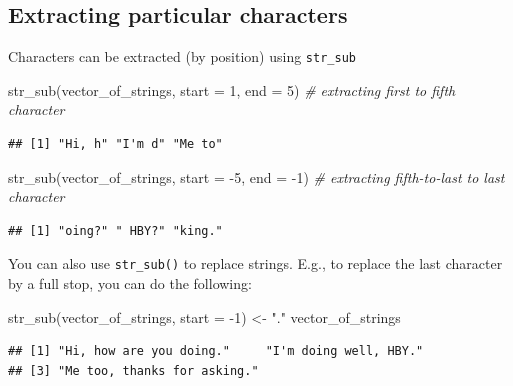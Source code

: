 \documentclass[
]{book}
\newenvironment{Shaded}{\begin{snugshade}}{\end{snugshade}}
\newcommand{\AttributeTok}[1]{\textcolor[rgb]{0.77,0.63,0.00}{#1}}
\newcommand{\CommentTok}[1]{\textcolor[rgb]{0.56,0.35,0.01}{\textit{#1}}}
\newcommand{\DecValTok}[1]{\textcolor[rgb]{0.00,0.00,0.81}{#1}}
\newcommand{\FunctionTok}[1]{\textcolor[rgb]{0.00,0.00,0.00}{#1}}
\newcommand{\NormalTok}[1]{#1}
\newcommand{\OtherTok}[1]{\textcolor[rgb]{0.56,0.35,0.01}{#1}}
\newcommand{\SpecialCharTok}[1]{\textcolor[rgb]{0.00,0.00,0.00}{#1}}
\newcommand{\StringTok}[1]{\textcolor[rgb]{0.31,0.60,0.02}{#1}}
\begin{document}
\hypertarget{extracting-particular-characters}{%
\subsection{Extracting particular characters}\label{extracting-particular-characters}}

Characters can be extracted (by position) using \texttt{str\_sub}

\begin{Shaded}
\begin{Highlighting}[]
\FunctionTok{str\_sub}\NormalTok{(vector\_of\_strings, }\AttributeTok{start =} \DecValTok{1}\NormalTok{, }\AttributeTok{end =} \DecValTok{5}\NormalTok{) }\CommentTok{\# extracting first to fifth character}
\end{Highlighting}
\end{Shaded}

\begin{verbatim}
## [1] "Hi, h" "I'm d" "Me to"
\end{verbatim}

\begin{Shaded}
\begin{Highlighting}[]
\FunctionTok{str\_sub}\NormalTok{(vector\_of\_strings, }\AttributeTok{start =} \SpecialCharTok{{-}}\DecValTok{5}\NormalTok{, }\AttributeTok{end =} \SpecialCharTok{{-}}\DecValTok{1}\NormalTok{) }\CommentTok{\# extracting fifth{-}to{-}last to last character}
\end{Highlighting}
\end{Shaded}

\begin{verbatim}
## [1] "oing?" " HBY?" "king."
\end{verbatim}

You can also use \texttt{str\_sub()} to replace strings. E.g., to replace the last character by a full stop, you can do the following:

\begin{Shaded}
\begin{Highlighting}[]
\FunctionTok{str\_sub}\NormalTok{(vector\_of\_strings, }\AttributeTok{start =} \SpecialCharTok{{-}}\DecValTok{1}\NormalTok{) }\OtherTok{\textless{}{-}} \StringTok{"."}
\NormalTok{vector\_of\_strings}
\end{Highlighting}
\end{Shaded}

\begin{verbatim}
## [1] "Hi, how are you doing."     "I'm doing well, HBY."      
## [3] "Me too, thanks for asking."
\end{verbatim}
\end{document}
